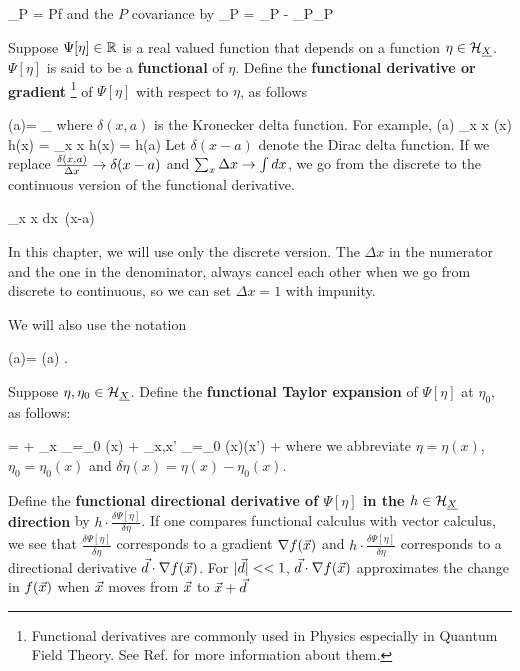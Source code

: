 \beq
{}_P = P\cdot f
\eeq
and the $P$ covariance by
\beq
{}_P =
_P - _P_P
\eeq

Suppose $\Psi[\eta]\in{ \mathbb{R}}$
is a real valued function
that depends on a function $\eta\in {\cal H}_{\underline{X}}$.
$\Psi[\eta]$ is said to be a {\bf functional} of $\eta$.
Define the
{\bf functional derivative or gradient }\footnote{
Functional derivatives are commonly used in Physics
especially in Quantum Field Theory.
See Ref.\cite{wiki-func-deri} for more
information about them.}
of $\Psi[\eta]$ with respect to $\eta$, as follows


\beq
\frac{\delta \Psi[\eta]}
{\delta \eta(a)}=
\lim_{\eps{}}
{\eps}
\eeq
where $\delta(x,a)$ is the Kronecker delta function.
For example,
\beq
\frac{\delta}
{\delta \eta(a)}
\sum_x \Delta x\; \eta(x) h(x)
=
\sum_x \Delta x  h(x)
=
h(a)
\eeq
 Let
$\delta(x-a)$ denote the Dirac delta function. If we replace
$\frac{\delta(x,a)}{\Delta x}\rightarrow\delta(x-a)$
and $\sum_x \Delta x\rightarrow \int dx$, we go
from the discrete to the continuous version
of the functional derivative.

\beq
\sum_x \Delta x 
\rarrow \int dx\, \delta(x-a)
\eeq

In this chapter, we will use only the discrete version.
The $\Delta x$ in the numerator
and the one in the denominator, always cancel
each other when we go from discrete
to continuous, so we can
set
$\Delta x=1$ with impunity.



We will also use the notation

\beq
\dpsi[\eta](a)=
\frac{\delta \Psi[\eta]}
{\delta \eta(a)}
\;.
\eeq

Suppose $\eta, \eta_0\in {\cal H}_{\underline{X}}$. Define the
{\bf functional Taylor expansion} of $\Psi[\eta]$
at $\eta_0$, as follows:

\beq
\Psi[\eta]=
\Psi[\eta_0]
+ \sum_x
_{\eta=\eta_0}
\delta\eta(x)
+
\sum_{x,x'}
_{\eta=\eta_0}
\delta\eta(x)\delta\eta(x')
+
\cdots
\eeq
where we abbreviate
$ \eta =\eta(x)$,
$\eta_0=\eta_0(x)$ and $\delta \eta(x) = \eta(x)-\eta_0(x)$.



Define the
{\bf functional directional derivative of $\Psi[\eta]$ in
the $h\in {\cal H}_{\underline{X}}$
direction}
by $h\cdot\frac{\delta \Psi[\eta]}{\delta \eta}$.
If one compares functional calculus with vector calculus, we see that
$\frac{\delta \Psi[\eta]}{\delta \eta}$ corresponds to a gradient
$\nabla f({\vec{x}})$ and
$h\cdot \frac{\delta \Psi[\eta]}{\delta \eta}$
corresponds to a directional derivative
${\vec{d}}\cdot \nabla f({\vec{x}})$.
For $|{\vec{d}}|<<1$, ${\vec{d}}\cdot \nabla f({\vec{x}})$ approximates
the change
in $f({\vec{x}})$ when ${\vec{x}}$ moves from ${\vec{x}}$ to ${\vec{x}}+{\vec{d}}$



